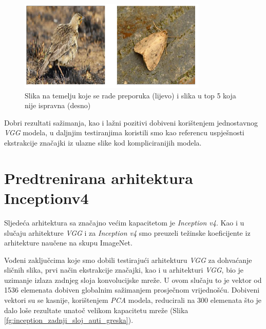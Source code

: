 \documentclass[times, utf8, proizvoljni, numeric]{fer}
\begin{document}
\begin{figure}[H]
\begin{center}
	\captionsetup{justification=centering}
	\includegraphics[width=0.8\textwidth]{./imgs/greske_vgg.png}
	\caption{Slika na temelju koje se rade preporuka (lijevo) i slika u top 5 koja nije ispravna (desno)}
	\label{fg:greske_vgg}
\end{center}
\end{figure}

Dobri rezultati sažimanja, kao i lažni pozitivi dobiveni korištenjem jednostavnog \textit{VGG} modela, u daljnjim testiranjima koristili smo kao referencu uspješnosti ekstrakcije značajki iz ulazne slike kod kompliciranijih modela.

\section{Predtrenirana arhitektura Inceptionv4}

Sljedeća arhitektura sa značajno većim kapacitetom je \textit{Inception v4}. Kao i u slučaju arhitekture \textit{VGG} i za \textit{Inception v4} smo preuzeli težinske koeficijente iz arhitekture naučene na skupu ImageNet.

Vođeni zaključcima koje smo dobili testirajući arhitekturu \textit{VGG} za dohvaćanje sličnih slika, prvi način ekstrakcije značajki, kao i u arhitekturi \textit{VGG}, bio je uzimanje izlaza zadnjeg sloja konvolucijske mreže. U ovom slučaju to je vektor od 1536 elemenata dobiven globalnim sažimanjem prosječnom vrijednošću. Dobiveni vektori su se kasnije, korištenjem \textit{PCA} modela, reducirali na 300 elemenata što je dalo loše rezultate unatoč velikom kapacitetu mreže (Slika \ref{fg:inception_zadnji_sloj_auti_greska}).
\end{document}
